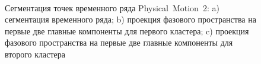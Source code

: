 \begin{figure}[h!t]\center
{}
\\
\caption{Сегментация точек временного ряда Physical~Motion~2: 
a) сегментация временного ряда; b) проекция фазового пространства на первые две главные компоненты для первого кластера; c) проекция фазового пространства на первые две главные компоненты для второго кластера}
\label{fig_real_segmentation}
\end{figure}
